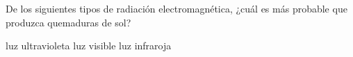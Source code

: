 
De los siguientes tipos de radiación electromagnética, ¿cuál es más
probable que produzca quemaduras de sol?

\begin{choices}
    \choice luz ultravioleta
    \choice luz visible
    \choice luz infraroja
\end{choices}